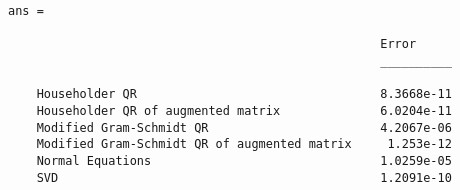 \documentclass[11pt]{article}
\begin{document}
\begin{enumerate}
\begin{enumerate}
                
                \begin{verbatim}
ans = 

                                                    Error   
                                                    __________

    Householder QR                                  8.3668e-11
    Householder QR of augmented matrix              6.0204e-11
    Modified Gram-Schmidt QR                        4.2067e-06
    Modified Gram-Schmidt QR of augmented matrix     1.253e-12
    Normal Equations                                1.0259e-05
    SVD                                             1.2091e-10
                \end{verbatim}

        \end{enumerate}

\end{enumerate}
\end{document}
